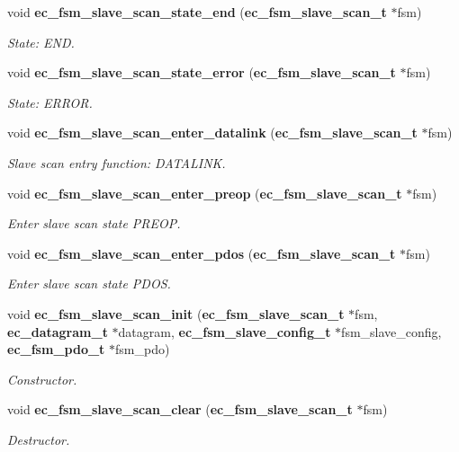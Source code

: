 \begin{DoxyCompactItemize}
void {\bf ec\-\_\-fsm\-\_\-slave\-\_\-scan\-\_\-state\-\_\-end} ({\bf ec\-\_\-fsm\-\_\-slave\-\_\-scan\-\_\-t} $\ast$fsm)
\begin{DoxyCompactList}\small\item\em State\-: E\-N\-D. \end{DoxyCompactList}\item 
void {\bf ec\-\_\-fsm\-\_\-slave\-\_\-scan\-\_\-state\-\_\-error} ({\bf ec\-\_\-fsm\-\_\-slave\-\_\-scan\-\_\-t} $\ast$fsm)
\begin{DoxyCompactList}\small\item\em State\-: E\-R\-R\-O\-R. \end{DoxyCompactList}\item 
void {\bf ec\-\_\-fsm\-\_\-slave\-\_\-scan\-\_\-enter\-\_\-datalink} ({\bf ec\-\_\-fsm\-\_\-slave\-\_\-scan\-\_\-t} $\ast$fsm)
\begin{DoxyCompactList}\small\item\em Slave scan entry function\-: D\-A\-T\-A\-L\-I\-N\-K. \end{DoxyCompactList}\item 
void {\bf ec\-\_\-fsm\-\_\-slave\-\_\-scan\-\_\-enter\-\_\-preop} ({\bf ec\-\_\-fsm\-\_\-slave\-\_\-scan\-\_\-t} $\ast$fsm)
\begin{DoxyCompactList}\small\item\em Enter slave scan state P\-R\-E\-O\-P. \end{DoxyCompactList}\item 
void {\bf ec\-\_\-fsm\-\_\-slave\-\_\-scan\-\_\-enter\-\_\-pdos} ({\bf ec\-\_\-fsm\-\_\-slave\-\_\-scan\-\_\-t} $\ast$fsm)
\begin{DoxyCompactList}\small\item\em Enter slave scan state P\-D\-O\-S. \end{DoxyCompactList}\item 
void {\bf ec\-\_\-fsm\-\_\-slave\-\_\-scan\-\_\-init} ({\bf ec\-\_\-fsm\-\_\-slave\-\_\-scan\-\_\-t} $\ast$fsm, {\bf ec\-\_\-datagram\-\_\-t} $\ast$datagram, {\bf ec\-\_\-fsm\-\_\-slave\-\_\-config\-\_\-t} $\ast$fsm\-\_\-slave\-\_\-config, {\bf ec\-\_\-fsm\-\_\-pdo\-\_\-t} $\ast$fsm\-\_\-pdo)
\begin{DoxyCompactList}\small\item\em Constructor. \end{DoxyCompactList}\item 
void {\bf ec\-\_\-fsm\-\_\-slave\-\_\-scan\-\_\-clear} ({\bf ec\-\_\-fsm\-\_\-slave\-\_\-scan\-\_\-t} $\ast$fsm)
\begin{DoxyCompactList}\small\item\em Destructor. \end{DoxyCompactList}\item 

\end{DoxyCompactItemize}
